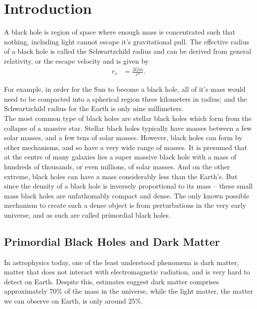 %
%
%
%
%

\chapter{Introduction}

A black hole is region of space where enough mass is concentrated such that nothing, including light cannot escape it's gravitational pull. The effective radius of a black hole is called the Schwartzchild radius and can be derived from general relativity, or the escape velocity and is given by
\begin{align*}
r_s &= \frac{2Gm}{c^2}.
\end{align*}

For example, in order for the Sun to become a black hole, all of it's mass would need to be compacted into a spherical region three kilometers in radius; and the Schwartzchild radius for the Earth is only nine millimeters. \\

The most common type of black holes are stellar black holes which form from the collapse of a massive star. Stellar black holes typically have masses between a few solar masses, and a few tens of solar masses. However, black holes can form by other mechanisms, and so have a very wide range of masses. It is presumed that at the centre of many galaxies lies a super massive black hole with a mass of hundreds of thousands, or even millions, of solar masses. And on the other extreme, black holes can have a mass considerably less than the Earth's. But since the density of a black hole is inversely proportional to its mass -- these small mass black holes are unfathomably compact and dense. The only known possible mechanism to create such a dense object is from perturbations in the very early universe, and as such are called primordial black holes.

\section{Primordial Black Holes and Dark Matter}

In astrophysics today, one of the least understood phenomena is dark matter, matter that does not interact with electromagnetic radiation, and is very hard to detect on Earth. Despite this, estimates suggest dark matter comprises approximately $70\%$ of the mass in the universe, while the light matter, the matter we can observe on Earth, is only around $25\%$. \\

